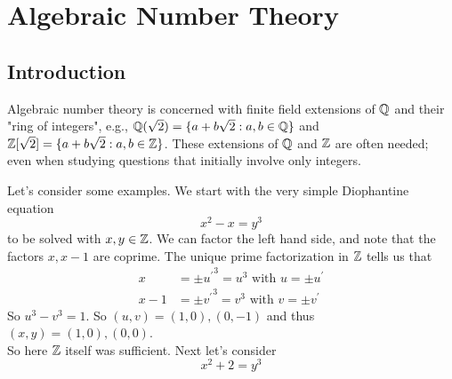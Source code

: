 \documentclass[NumTh.tex]{subfiles}
\begin{document}
\section{Algebraic Number Theory}

\subsection{Introduction}

Algebraic number theory is concerned with finite field extensions of $\mathbb{Q}$ and their "ring of integers",
e.g., $\mathbb{Q}(\sqrt{2}) = \{a + b\sqrt{2}: a,b\in \mathbb{Q} \}$ and $\mathbb{Z}[\sqrt{2}] = \{ a + b \sqrt{2} : a,b \in \mathbb{Z} \}$.
These extensions of $\mathbb{Q}$ and $\mathbb{Z}$ are often needed; even when studying questions that initially involve only integers.

Let's consider some examples.
We start with the very simple Diophantine equation
\[ x^2 -x = y^3 \]
to be solved with $x,y \in \mathbb{Z}$.
We can factor the left hand side, and note that the factors $x, x-1$ are coprime.
The unique prime factorization in $\mathbb{Z}$ tells us that 
\begin{align*}
  x &= \pm {u^\prime}^3 = u^3 \text{ with } u = \pm u^\prime\\
  x -1 &= \pm {v^\prime}^3 = v^3 \text{ with } v = \pm v^\prime
\end{align*}
So $u^3 - v^3 = 1$.
So $(u,v) = (1,0), (0,-1)$ and thus $(x,y) = (1,0), (0,0)$.\\

So here $\mathbb{Z}$ itself was sufficient. Next let's consider
\[ x^2 + 2 = y^3 \]
\end{document}
